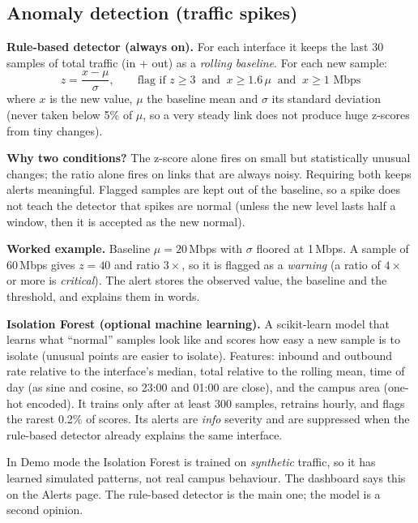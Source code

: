 \documentclass[11pt,a4paper]{article}
\begin{document}
\subsection{Anomaly detection (traffic spikes)}

\textbf{Rule-based detector (always on).} For each interface it keeps the last 30 samples of total traffic (in + out) as a
\emph{rolling baseline}. For each new sample:
\[
z = \frac{x - \mu}{\sigma}, \qquad \text{flag if } z \geq 3 \ \text{ and } \ x \geq 1.6\,\mu \ \text{ and } \ x \geq 1\text{ Mbps}
\]
where $x$ is the new value, $\mu$ the baseline mean and $\sigma$ its standard deviation (never taken below 5\% of $\mu$, so a very
steady link does not produce huge z-scores from tiny changes).

\textbf{Why two conditions?} The z-score alone fires on small but statistically unusual changes; the ratio alone fires on links
that are always noisy. Requiring both keeps alerts meaningful. Flagged samples are kept out of the baseline, so a spike does not
teach the detector that spikes are normal (unless the new level lasts half a window, then it is accepted as the new normal).

\textbf{Worked example.} Baseline $\mu = 20$\,Mbps with $\sigma$ floored at 1\,Mbps. A sample of 60\,Mbps gives $z = 40$ and
ratio $3\times$, so it is flagged as a \emph{warning} (a ratio of $4\times$ or more is \emph{critical}). The alert stores the
observed value, the baseline and the threshold, and explains them in words.

\textbf{Isolation Forest (optional machine learning).} A scikit-learn model that learns what ``normal'' samples look like and
scores how easy a new sample is to isolate (unusual points are easier to isolate). Features: inbound and outbound rate relative to
the interface's median, total relative to the rolling mean, time of day (as sine and cosine, so 23:00 and 01:00 are close), and
the campus area (one-hot encoded). It trains only after at least 300 samples, retrains hourly, and flags the rarest 0.2\% of
scores. Its alerts are \emph{info} severity and are suppressed when the rule-based detector already explains the same interface.

\begin{careful}
In Demo mode the Isolation Forest is trained on \emph{synthetic} traffic, so it has learned simulated patterns, not real campus
behaviour. The dashboard says this on the Alerts page. The rule-based detector is the main one; the model is a second opinion.
\end{careful}
\end{document}
